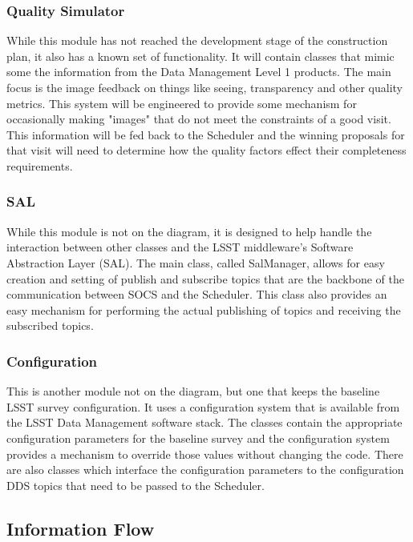 \documentclass[]{spie}  %
\begin{document}
\subsubsection{Quality Simulator}

While this module has not reached the development stage of the construction plan, it also has a known set of functionality. It will contain classes that mimic some the information from the Data Management Level 1 products\cite{DPDD}. The main focus is the image feedback on things like seeing, transparency and other quality metrics. This system will be engineered to provide some mechanism for occasionally making "images" that do not meet the constraints of a good visit. This information will be fed back to the Scheduler and the winning proposals for that visit will need to determine how the quality factors effect their completeness requirements.

\subsubsection{SAL}

While this module is not on the diagram, it is designed to help handle the interaction between other classes and the LSST middleware's Software Abstraction Layer (SAL). The main class, called SalManager, allows for easy creation and setting of publish and subscribe topics that are the backbone of the communication between SOCS and the Scheduler. This class also provides an easy mechanism for performing the actual publishing of topics and receiving the subscribed topics.

\subsubsection{Configuration}

This is another module not on the diagram, but one that keeps the baseline LSST survey configuration. It uses a configuration system that is available from the LSST Data Management software stack\cite{2015arXiv151207914J}. The classes contain the appropriate configuration parameters for the baseline survey and the configuration system provides a mechanism to override those values without changing the code. There are also classes which interface the configuration parameters to the configuration DDS topics that need to be passed to the Scheduler.

\subsection{Information Flow}
\end{document}
